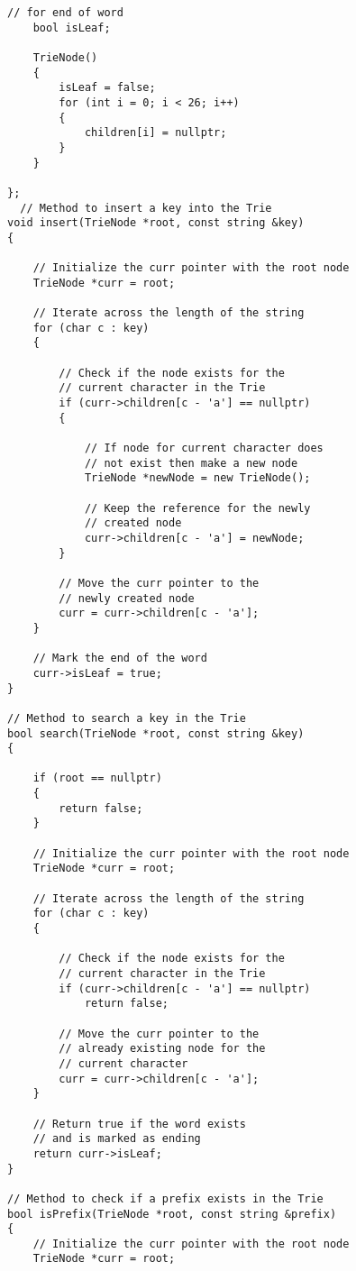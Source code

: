 \documentclass[10pt]{article}
\begin{document}
\begin{multicols*}{2}
\begin{lstlisting}[style=compactcpp]
    // for end of word
    bool isLeaf;

    TrieNode()
    {
        isLeaf = false;
        for (int i = 0; i < 26; i++)
        {
            children[i] = nullptr;
        }
    }

};
  // Method to insert a key into the Trie
void insert(TrieNode *root, const string &key)
{

    // Initialize the curr pointer with the root node
    TrieNode *curr = root;

    // Iterate across the length of the string
    for (char c : key)
    {

        // Check if the node exists for the
        // current character in the Trie
        if (curr->children[c - 'a'] == nullptr)
        {

            // If node for current character does
            // not exist then make a new node
            TrieNode *newNode = new TrieNode();

            // Keep the reference for the newly
            // created node
            curr->children[c - 'a'] = newNode;
        }

        // Move the curr pointer to the
        // newly created node
        curr = curr->children[c - 'a'];
    }

    // Mark the end of the word
    curr->isLeaf = true;
}

// Method to search a key in the Trie
bool search(TrieNode *root, const string &key)
{

    if (root == nullptr)
    {
        return false;
    }

    // Initialize the curr pointer with the root node
    TrieNode *curr = root;

    // Iterate across the length of the string
    for (char c : key)
    {

        // Check if the node exists for the
        // current character in the Trie
        if (curr->children[c - 'a'] == nullptr)
            return false;

        // Move the curr pointer to the
        // already existing node for the
        // current character
        curr = curr->children[c - 'a'];
    }

    // Return true if the word exists
    // and is marked as ending
    return curr->isLeaf;
}

// Method to check if a prefix exists in the Trie
bool isPrefix(TrieNode *root, const string &prefix)
{
    // Initialize the curr pointer with the root node
    TrieNode *curr = root;


\end{lstlisting}
\end{multicols*}
\end{document}
